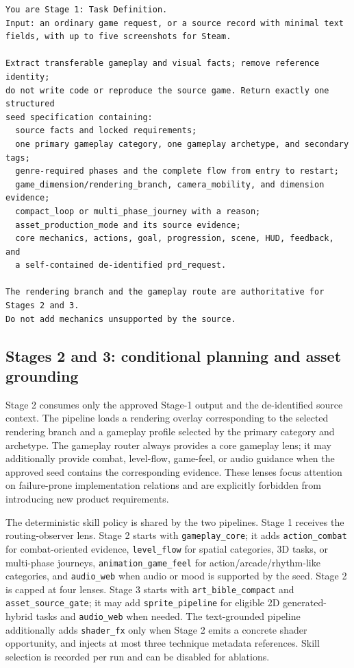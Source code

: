\documentclass{article}
\begin{document}
\begin{tcolorbox}[enhanced,breakable,colback=white,colframe=black,title=\textbf{Prompt: Stage-1 Task Definition},fonttitle=\small]
\begin{Verbatim}[fontsize=\scriptsize]
You are Stage 1: Task Definition.
Input: an ordinary game request, or a source record with minimal text
fields, with up to five screenshots for Steam.

Extract transferable gameplay and visual facts; remove reference identity;
do not write code or reproduce the source game. Return exactly one structured
seed specification containing:
  source facts and locked requirements;
  one primary gameplay category, one gameplay archetype, and secondary tags;
  genre-required phases and the complete flow from entry to restart;
  game_dimension/rendering_branch, camera_mobility, and dimension evidence;
  compact_loop or multi_phase_journey with a reason;
  asset_production_mode and its source evidence;
  core mechanics, actions, goal, progression, scene, HUD, feedback, and
  a self-contained de-identified prd_request.

The rendering branch and the gameplay route are authoritative for Stages 2 and 3.
Do not add mechanics unsupported by the source.
\end{Verbatim}
\end{tcolorbox}

\subsection{Stages 2 and 3: conditional planning and asset grounding}
\label{app:stage23_routing}

Stage 2 consumes only the approved Stage-1 output and the de-identified source context. The pipeline loads a rendering overlay corresponding to the selected rendering branch and a gameplay profile selected by the primary category and archetype. The gameplay router always provides a core gameplay lens; it may additionally provide combat, level-flow, game-feel, or audio guidance when the approved seed contains the corresponding evidence. These lenses focus attention on failure-prone implementation relations and are explicitly forbidden from introducing new product requirements.

The deterministic skill policy is shared by the two pipelines. Stage 1 receives the routing-observer lens. Stage 2 starts with \texttt{gameplay\_core}; it adds \texttt{action\_combat} for combat-oriented evidence, \texttt{level\_flow} for spatial categories, 3D tasks, or multi-phase journeys, \texttt{animation\_game\_feel} for action/arcade/rhythm-like categories, and \texttt{audio\_web} when audio or mood is supported by the seed. Stage 2 is capped at four lenses. Stage 3 starts with \texttt{art\_bible\_compact} and \texttt{asset\_source\_gate}; it may add \texttt{sprite\_pipeline} for eligible 2D generated-hybrid tasks and \texttt{audio\_web} when needed. The text-grounded pipeline additionally adds \texttt{shader\_fx} only when Stage 2 emits a concrete shader opportunity, and injects at most three technique metadata references. Skill selection is recorded per run and can be disabled for ablations.
\end{document}
